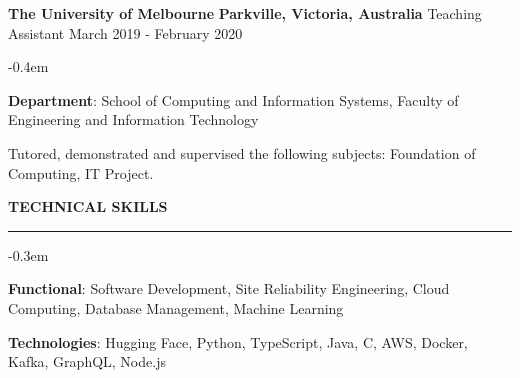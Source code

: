 \documentclass{cv}
\begin{document}
\begin{list}{}{\setlength{\leftmargin}{0em}}
\begin{list}{\raisebox{0.2em}{\tiny$\bullet$} \hspace{0em}}{\setlength{\leftmargin}{2.0em}}
    \end{list}
\item
    \textbf{The University of Melbourne} \hfill \textbf{Parkville, Victoria, Australia}%
    \vspace{0.1em} \newline 
    {Teaching Assistant} \hfill {March 2019 - February 2020}%
    \begin{list}{\raisebox{0.2em}{\tiny$\bullet$} \hspace{0em}}{\setlength{\leftmargin}{2.0em}}
        \itemsep -0.4em \vspace{-0.4em}
        \item \textbf{Department}: School of Computing and Information Systems, Faculty of Engineering and Information Technology
        \item Tutored, demonstrated and supervised the following subjects: Foundation of Computing, IT Project.
    \end{list}
\end{list}


\sectionskip


 \textbf{TECHNICAL SKILLS}
\sectionlineskip
\hrule
\begin{list}{}{\setlength{\leftmargin}{0em}}
\itemsep -0.3em
\item
    \textbf{Functional}: Software Development, Site Reliability Engineering, Cloud Computing, Database Management, Machine Learning
\item
    \textbf{Technologies}:  Hugging Face, Python, TypeScript, Java, C, AWS, Docker, Kafka, GraphQL, Node.js
\end{list}


\sectionskip

\end{document}
